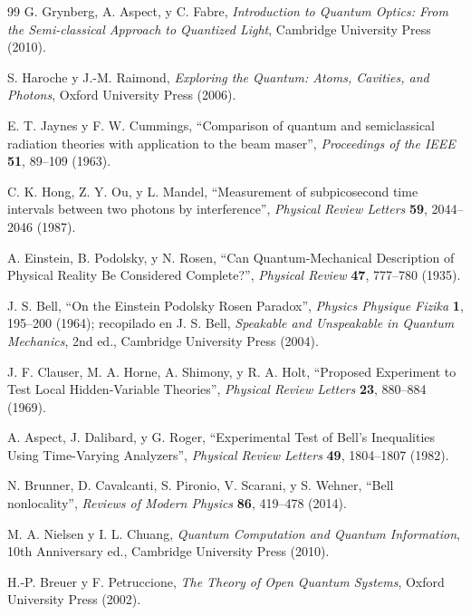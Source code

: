 \documentclass[11pt,a4paper]{book}
\begin{document}
\begin{thebibliography}{99}
G. Grynberg, A. Aspect, y C. Fabre, \textit{Introduction to Quantum Optics: From the Semi-classical Approach to Quantized Light}, Cambridge University Press (2010).

S. Haroche y J.-M. Raimond, \textit{Exploring the Quantum: Atoms, Cavities, and Photons}, Oxford University Press (2006).

E. T. Jaynes y F. W. Cummings, ``Comparison of quantum and semiclassical radiation theories with application to the beam maser'', \textit{Proceedings of the IEEE} \textbf{51}, 89--109 (1963).

C. K. Hong, Z. Y. Ou, y L. Mandel, ``Measurement of subpicosecond time intervals between two photons by interference'', \textit{Physical Review Letters} \textbf{59}, 2044--2046 (1987).

A. Einstein, B. Podolsky, y N. Rosen, ``Can Quantum-Mechanical Description of Physical Reality Be Considered Complete?'', \textit{Physical Review} \textbf{47}, 777--780 (1935).

J. S. Bell, ``On the Einstein Podolsky Rosen Paradox'', \textit{Physics Physique Fizika} \textbf{1}, 195--200 (1964); recopilado en J. S. Bell, \textit{Speakable and Unspeakable in Quantum Mechanics}, 2nd ed., Cambridge University Press (2004).

J. F. Clauser, M. A. Horne, A. Shimony, y R. A. Holt, ``Proposed Experiment to Test Local Hidden-Variable Theories'', \textit{Physical Review Letters} \textbf{23}, 880--884 (1969).

A. Aspect, J. Dalibard, y G. Roger, ``Experimental Test of Bell's Inequalities Using Time-Varying Analyzers'', \textit{Physical Review Letters} \textbf{49}, 1804--1807 (1982).

N. Brunner, D. Cavalcanti, S. Pironio, V. Scarani, y S. Wehner, ``Bell nonlocality'', \textit{Reviews of Modern Physics} \textbf{86}, 419--478 (2014).

M. A. Nielsen y I. L. Chuang, \textit{Quantum Computation and Quantum Information}, 10th Anniversary ed., Cambridge University Press (2010).

H.-P. Breuer y F. Petruccione, \textit{The Theory of Open Quantum Systems}, Oxford University Press (2002).

\end{thebibliography}
\end{document}
